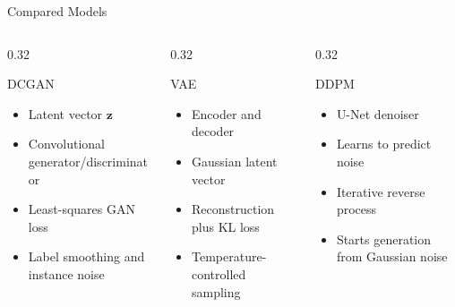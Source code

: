 \documentclass[aspectratio=169]{beamer}
\begin{document}
\begin{frame}{Compared Models}
  \begin{columns}[T]
    \begin{column}{0.32\linewidth}
      \begin{block}{DCGAN}
        \begin{itemize}
          \item Latent vector $\mathbf{z}$
          \item Convolutional generator/discriminator
          \item Least-squares GAN loss
          \item Label smoothing and instance noise
        \end{itemize}
      \end{block}
    \end{column}
    \begin{column}{0.32\linewidth}
      \begin{block}{VAE}
        \begin{itemize}
          \item Encoder and decoder
          \item Gaussian latent vector
          \item Reconstruction plus KL loss
          \item Temperature-controlled sampling
        \end{itemize}
      \end{block}
    \end{column}
    \begin{column}{0.32\linewidth}
      \begin{block}{DDPM}
        \begin{itemize}
          \item U-Net denoiser
          \item Learns to predict noise
          \item Iterative reverse process
          \item Starts generation from Gaussian noise
        \end{itemize}
      \end{block}
    \end{column}
  \end{columns}
\end{frame}
\end{document}
